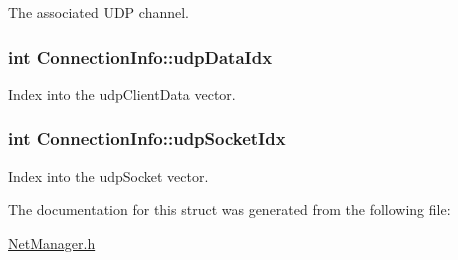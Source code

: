 The associated U\-D\-P channel. 

\hypertarget{structConnectionInfo_a765196ed390588341d9dc01606f5a6ed}{
\subsubsection[{udp\-Data\-Idx}]{\setlength{\rightskip}{0pt plus 5cm}int Connection\-Info\-::udp\-Data\-Idx}}\label{structConnectionInfo_a765196ed390588341d9dc01606f5a6ed}


Index into the udp\-Client\-Data vector. 

\hypertarget{structConnectionInfo_a976929d9eef61ec3aee6984376e3a3cc}{
\subsubsection[{udp\-Socket\-Idx}]{\setlength{\rightskip}{0pt plus 5cm}int Connection\-Info\-::udp\-Socket\-Idx}}\label{structConnectionInfo_a976929d9eef61ec3aee6984376e3a3cc}


Index into the udp\-Socket vector. 



The documentation for this struct was generated from the following file\-:\begin{DoxyCompactItemize}
\item 
\hyperlink{NetManager_8h}{Net\-Manager.\-h}\end{DoxyCompactItemize}

